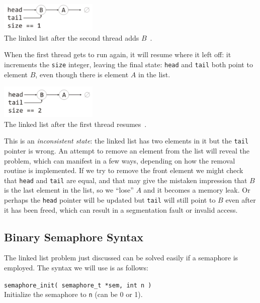\begin{center}
\includegraphics[width=0.35\textwidth]{images/linkedlist2.png}\\
The linked list after the second thread adds $B$~\cite{mte241}.
\end{center}

When the first thread gets to run again, it will resume where it left off: it increments the \texttt{size} integer, leaving the final state: \texttt{head} and \texttt{tail} both point to element $B$, even though there is element $A$ in the list.

\begin{center}
\includegraphics[width=0.35\textwidth]{images/linkedlist3.png}\\
The linked list after the first thread resumes~\cite{mte241}.
\end{center}

This is an \textit{inconsistent state}: the linked list has two elements in it but the \texttt{tail} pointer is wrong. An attempt to remove an element from the list will reveal the problem, which can manifest in a few ways, depending on how the removal routine is implemented. If we try to remove the front element we might check that \texttt{head} and \texttt{tail} are equal, and that may give the mistaken impression that $B$ is the last element in the list, so we ``lose'' $A$ and it becomes a memory leak. Or perhaps the \texttt{head} pointer will be updated but \texttt{tail} will still point to $B$ even after it has been freed, which can result in a segmentation fault or invalid access.

\subsection*{Binary Semaphore Syntax}
The linked list problem just discussed can be solved easily if a semaphore is employed. The syntax we will use is as follows:

\texttt{semaphore\_init( semaphore\_t *sem, int n )}\\
Initialize the semaphore to \texttt{n} (can be 0 or 1).

